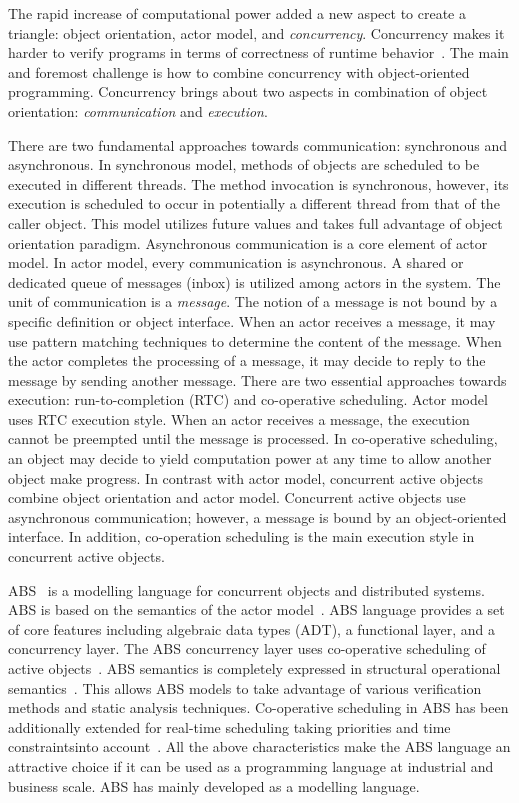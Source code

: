 The rapid increase of computational power added a new aspect to create a triangle: object orientation, actor model, and \emph{concurrency}.
Concurrency makes it harder to verify programs in terms of correctness of runtime behavior~\cite{Herlihy:1990:linear,johnsen:history,agha:predictive:safety}. 
The main and foremost challenge is how to combine concurrency with object-oriented programming.
Concurrency brings about two aspects in combination of object orientation: \emph{communication} and \emph{execution}.

There are two fundamental approaches towards communication: synchronous and asynchronous. 
In synchronous model, methods of objects are scheduled to be executed in different threads.
The method invocation is synchronous, however, its execution is scheduled to occur in potentially a different thread from that of the caller object.
This model utilizes future values and takes full advantage of object orientation paradigm.
Asynchronous communication is a core element of actor model.
In actor model, every communication is asynchronous. 
A shared or dedicated queue of messages (inbox) is utilized among actors in the system.
The unit of communication is a \emph{message}.
The notion of a message is not bound by a specific definition or object interface.
When an actor receives a message, it may use pattern matching techniques to determine the content of the message.
When the actor completes the processing of a message, it may decide to reply to the message by sending another message.
There are two essential approaches towards execution: run-to-completion (RTC) and co-operative scheduling.
Actor model uses RTC execution style.
When an actor receives a message, the execution cannot be preempted until the message is processed. 
In co-operative scheduling, an object may decide to yield computation power at any time to allow another object make progress.
In contrast with actor model, concurrent active objects~\cite{creol:broch:owe} combine object orientation and actor model. 
Concurrent active objects use asynchronous communication; however, a message is bound by an object-oriented interface.
In addition, co-operation scheduling is the main execution style in concurrent active objects.

ABS~\cite{johnsen2012abs,hahnlehjlssw11} is a modelling language for concurrent objects and distributed systems.
ABS is based on the semantics of the actor model~\cite{actors:agha}.
ABS language provides a set of core features including algebraic data types (ADT), a functional layer, and a concurrency layer.
The ABS concurrency layer uses co-operative scheduling of active objects~\cite{creol:broch:owe}.
ABS semantics is completely expressed in structural operational semantics~\cite{plotkin:sos}.
This allows ABS models to take advantage of various verification methods and static analysis techniques.
% 
Co-operative scheduling in ABS has been additionally extended for real-time scheduling taking priorities and time constraintsinto account~\cite{bjork2013:rtabs,johnsen2012modeling}.
All the above characteristics make the ABS language an attractive choice if it
can be used as a programming language at industrial and business scale.
ABS has mainly developed as a modelling language.

